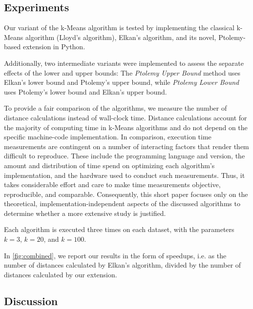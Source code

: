 \subsection{Experiments}
Our variant of the k-Means algorithm is tested by implementing the classical k-Means algorithm (Lloyd's algorithm), Elkan's algorithm, and its novel, Ptolemy-based extension in Python.

Additionally, two intermediate variants were implemented to assess the separate effects of the lower and upper bounds:
The \emph{Ptolemy Upper Bound} method uses Elkan's lower bound and Ptolemy's upper bound, while \emph{Ptolemy Lower Bound} uses Ptolemy's lower bound and Elkan's upper bound.

To provide a fair comparison of the algorithms,
we measure the number of distance calculations instead of wall-clock time.
Distance calculations account for the majority of computing time in k-Means algorithms and do not depend on the specific machine-code implementation.
In comparison, execution time measurements are contingent on a number of interacting factors that render them difficult to reproduce.
These include the programming language and version, the amount and distribution of time spend on optimizing each algorithm's implementation, and the hardware used to conduct such measurements.
Thus, it takes considerable effort and care to make time measurements objective, reproducible, and comparable.
Consequently, this short paper focuses only on the theoretical, implementation-independent aspects of the discussed algorithms to determine whether a more extensive study is justified.


Each algorithm is executed three times on each dataset, with the parameters $k = 3$, $k = 20$, and $k = 100$.

In \autoref{fig:combined},
we report our results in the form of speedups,
i.e. as the number of distances calculated by Elkan's algorithm,
divided by the number of distances  calculated by our extension.



\subsection{Discussion}

